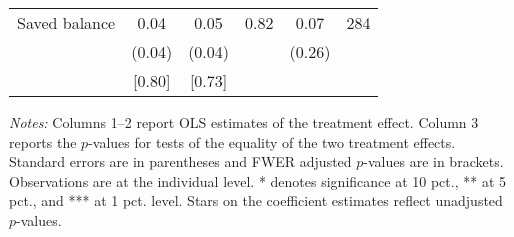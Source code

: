\begin{table}[h]
{\begin{threeparttable}
\begin{tabular}{l*{5}{c}}
Saved balance&     0.04&     0.05&     0.82&     0.07&      284\\
          &   (0.04)&   (0.04)&         &   (0.26)&         \\
          &   [0.80]&   [0.73]&         &         &         \\
\bottomrule \end{tabular} \begin{tablenotes}[flushleft] \footnotesize \item \emph{Notes:} Columns 1--2 report OLS estimates of the treatment effect. Column 3 reports the \(p\)-values for tests of the equality of the two treatment effects. Standard errors are in parentheses and FWER adjusted \(p\)-values are in brackets. Observations are at the individual level. * denotes significance at 10 pct., ** at 5 pct., and *** at 1 pct. level. Stars on the coefficient estimates reflect unadjusted \(p\)-values. \end{tablenotes} \end{threeparttable} } \end{table}

